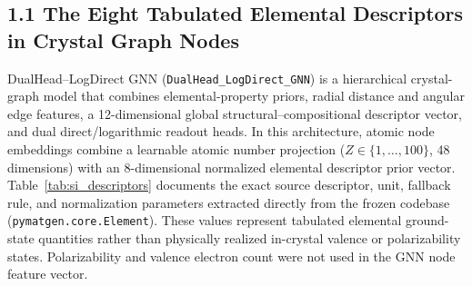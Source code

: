 \documentclass[journal,article,submit,moreauthors,pdftex]{article}
\begin{document}
\subsection*{1.1 The Eight Tabulated Elemental Descriptors in Crystal Graph Nodes}
DualHead--LogDirect GNN (\texttt{DualHead\_LogDirect\_GNN}) is a hierarchical crystal-graph model that combines elemental-property priors, radial distance and angular edge features, a 12-dimensional global structural--compositional descriptor vector, and dual direct/logarithmic readout heads. In this architecture, atomic node embeddings combine a learnable atomic number projection ($Z \in \{1, \dots, 100\}$, 48 dimensions) with an 8-dimensional normalized elemental descriptor prior vector. Table~\ref{tab:si_descriptors} documents the exact source descriptor, unit, fallback rule, and normalization parameters extracted directly from the frozen codebase (\texttt{pymatgen.core.Element}). These values represent tabulated elemental ground-state quantities rather than physically realized in-crystal valence or polarizability states. Polarizability and valence electron count were not used in the GNN node feature vector.

\begin{table}[htbp]
\centering
\caption{The eight tabulated elemental descriptors incorporated into atom node embeddings in \texttt{DualHead\_LogDirect\_GNN}. Descriptors are extracted from \texttt{pymatgen.core.Element} across atomic numbers $Z \in [1, 100]$ and normalized via standard score $z = (x - \mu)/\sigma$.}
\label{tab:si_descriptors}
\end{table}
\end{document}

